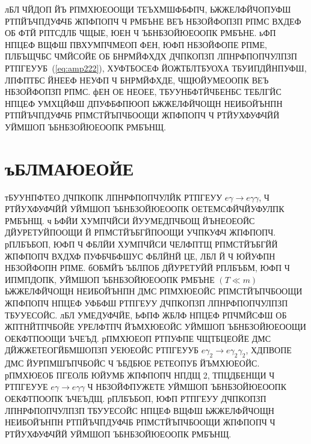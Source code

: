 \documentclass[koi8-r]{pazh2col}
\begin{document}
лБЛ ЧЙДОП ЙЪ РПМХЮЕООЩИ ТЕЪХМШФБФПЧ, ЬЖЖЕЛФЙЧОПУФШ РТПЙЪЧПДУФЧБ ЖПФПОПЧ Ч РМБЪНЕ ВЕЪ НБЗОЙФОПЗП РПМС 
ВХДЕФ ОБ ФТЙ РПТСДЛБ ЧЩЫЕ, ЮЕН Ч ЪБНБЗОЙЮЕООПК РМБЪНЕ. ьФП НПЦЕФ ВЩФШ ПВХУМПЧМЕОП ФЕН, ЮФП  
 НБЗОЙФОПЕ РПМЕ, ПЛБЪЩЧБС ЧМЙСОЙЕ ОБ БНРМЙФХДХ ДЧПКОПЗП ЛПНРФПОПЧУЛПЗП 
 РТПГЕУУБ~(\ref{eq:amp222}), ХУФТБОСЕФ ЙОЖТБЛТБУОХА ТБУИПДЙНПУФШ, ЛПФПТБС ЙНЕЕФ НЕУФП Ч БНРМЙФХДЕ, 
ЧЩЮЙУМЕООПК ВЕЪ НБЗОЙФОПЗП РПМС.
 фЕН ОЕ НЕОЕЕ, ТБУУНБФТЙЧБЕНБС ТЕБЛГЙС НПЦЕФ УМХЦЙФШ ДПУФБФПЮОП ЬЖЖЕЛФЙЧОЩН НЕИБОЙЪНПН 
РТПЙЪЧПДУФЧБ РПМСТЙЪПЧБООЩИ ЖПФПОПЧ Ч РТЙУХФУФЧЙЙ УЙМШОП ЪБНБЗОЙЮЕООПК РМБЪНЩ.




\section{ъБЛМАЮЕОЙЕ}
\label{sect:concl}

тБУУНПФТЕО ДЧПКОПК ЛПНРФПОПЧУЛЙК РТПГЕУУ $e\gamma\to e\gamma\gamma$,
  Ч РТЙУХФУФЧЙЙ УЙМШОП ЪБНБЗОЙЮЕООПК ОЕТЕМСФЙЧЙУФУЛПК РМБЪНЩ.
 ч ЬФЙИ ХУМПЧЙСИ ЙУУМЕДПЧБОЩ ЙЪНЕОЕОЙС ДЙУРЕТУЙПООЩИ Й РПМСТЙЪБГЙПООЩИ УЧПКУФЧ ЖПФПОПЧ. 
рПЛБЪБОП, ЮФП Ч ФБЛЙИ ХУМПЧЙСИ 
ЧЕЛФПТЩ РПМСТЙЪБГЙЙ ЖПФПОПЧ ВХДХФ ПУФБЧБФШУС  ФБЛЙНЙ ЦЕ, ЛБЛ Й Ч ЮЙУФПН НБЗОЙФОПН РПМЕ.
 бОБМЙЪ ЪБЛПОБ ДЙУРЕТУЙЙ РПЛБЪБМ,  ЮФП  Ч ИПМПДОПК, УЙМШОП ЪБНБЗОЙЮЕООПК  РМБЪНЕ $(T \ll  m)$  
 ЬЖЖЕЛФЙЧОЩН НЕИБОЙЪНПН ДМС РПМХЮЕОЙС РПМСТЙЪПЧБООЩИ ЖПФПОПЧ 
  НПЦЕФ УФБФШ РТПГЕУУ ДЧПКОПЗП ЛПНРФПОПЧУЛПЗП ТБУУЕСОЙС.
лБЛ УМЕДУФЧЙЕ, ЬФПФ ЖБЛФ НПЦЕФ РПЧМЙСФШ ОБ ЖПТНЙТПЧБОЙЕ УРЕЛФТПЧ ЙЪМХЮЕОЙС 
УЙМШОП ЪБНБЗОЙЮЕООЩИ ОЕКФТПООЩИ ЪЧЕЪД.
 рПМХЮЕОП РТПУФПЕ ЧЩТБЦЕОЙЕ ДМС ДЙЖЖЕТЕОГЙБМШОПЗП УЕЮЕОЙС РТПГЕУУБ $e\gamma_2 \to e\gamma_2 \gamma_2$, ХДПВОПЕ 
ДМС ЙУРПМШЪПЧБОЙС Ч ЪБДБЮЕ РЕТЕОПУБ ЙЪМХЮЕОЙС. 
 рПМХЮЕОБ  ПГЕОЛБ ЮЙУМБ ЖПФПОПЧ НПДЩ 2, ТПЦДБЕНЩИ Ч РТПГЕУУЕ 
$e \gamma \to e \gamma \gamma$ Ч НБЗОЙФПУЖЕТЕ УЙМШОП ЪБНБЗОЙЮЕООПК ОЕКФТПООПК ЪЧЕЪДЩ. рПЛБЪБОП, 
ЮФП  РТПГЕУУ  ДЧПКОПЗП ЛПНРФПОПЧУЛПЗП ТБУУЕСОЙС НПЦЕФ ВЩФШ
ЬЖЖЕЛФЙЧОЩН НЕИБОЙЪНПН РТПЙЪЧПДУФЧБ РПМСТЙЪПЧБООЩИ ЖПФПОПЧ Ч РТЙУХФУФЧЙЙ УЙМШОП ЪБНБЗОЙЮЕООПК РМБЪНЩ.


\end{document}
